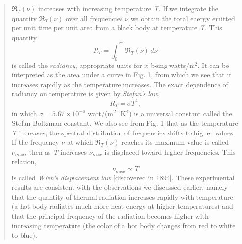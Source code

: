 \begin{quotation}
$\Re_T(\nu)$ increases with increasing temperature
\emph{T}. If we integrate the quantity $\Re_T(\nu)$ over
all frequencies $\nu$ we obtain the total energy emitted per unit
time per unit area from a black body at temperature \emph{T}. This
quantity
%
\begin{equation}
R_T = \int_{0}^{\infty}\! \Re_T(\nu)\, d\nu
\end{equation}
%
is called the \emph{radiancy}, appropriate units for it being
watts/m$^2$. It can be interpreted as the area under a
curve in Fig. 1, from which we see that it increases rapidly as the
temperature increases. The exact dependence of radiancy on temperature
is given by \emph{Stefan's law},
%
\begin{equation}
R_T = \sigma T^{4},
\end{equation}
%
in which $\sigma = 5.67 \times 10^{-8}$ watt/(m\textsuperscript{2} $^\circ$K\textsuperscript{4}) is a universal
constant called the Stefan-Boltzman constant. We also see from Fig. 1
that as the temperature \emph{T} increases, the spectral distribution of
frequencies shifts to higher values. If the frequency $\nu$ at which
$\Re_T(\nu)$ reaches its maximum value is called
$\nu_{max}$, then as \emph{T} increases
$\nu_{max}$ is displaced toward higher frequencies. This
relation,
%
\begin{equation}\label{eq:planck_3}%
\nu_{max} \propto T
\end{equation}
%
is called \emph{Wien's displacement law} {[}discovered in 1894{]}. These
experimental results are consistent with the observations we discussed
earlier, namely that the quantity of thermal radiation increases rapidly
with temperature (a hot body radiates much more heat energy at higher
temperatures) and that the principal frequency of the radiation becomes
higher with increasing temperature (the color of a hot body changes from
red to white to blue).


\end{quotation}
